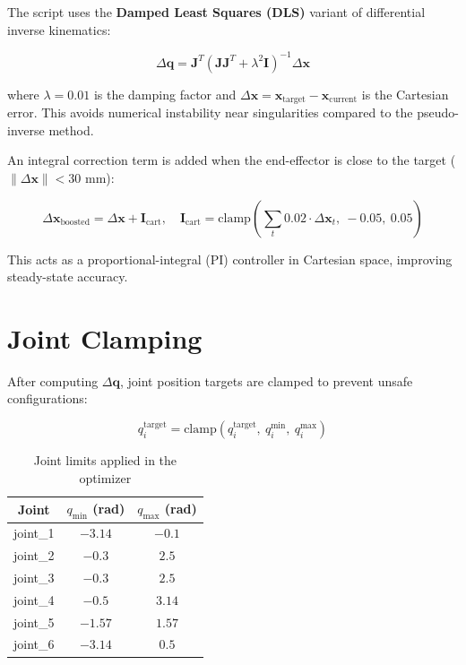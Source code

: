 \documentclass[a4paper,11pt]{article}
\begin{document}
The script uses the \textbf{Damped Least Squares (DLS)} variant of differential inverse kinematics:

\begin{equation}
    \Delta\mathbf{q} = \mathbf{J}^T \left(\mathbf{J}\mathbf{J}^T + \lambda^2 \mathbf{I}\right)^{-1} \Delta\mathbf{x}
    \label{eq:dls}
\end{equation}

where $\lambda = 0.01$ is the damping factor and $\Delta\mathbf{x} = \mathbf{x}_{\text{target}} - \mathbf{x}_{\text{current}}$ is the Cartesian error. This avoids numerical instability near singularities compared to the pseudo-inverse method.

An integral correction term is added when the end-effector is close to the target ($\|\Delta\mathbf{x}\| < 30$ mm):

\begin{equation}
    \Delta\mathbf{x}_{\text{boosted}} = \Delta\mathbf{x} + \mathbf{I}_{\text{cart}}, \quad \mathbf{I}_{\text{cart}} = \text{clamp}\!\left(\sum_{t} 0.02 \cdot \Delta\mathbf{x}_t,\ -0.05,\ 0.05\right)
\end{equation}

This acts as a proportional-integral (PI) controller in Cartesian space, improving steady-state accuracy.

\section{Joint Clamping}

After computing $\Delta\mathbf{q}$, joint position targets are clamped to prevent unsafe configurations:

\begin{equation}
    q_i^{\text{target}} = \text{clamp}(q_i^{\text{target}},\ q_i^{\min},\ q_i^{\max})
\end{equation}

\begin{table}[h]
\centering
\caption{Joint limits applied in the optimizer}
\begin{tabular}{ccc}
\toprule
\textbf{Joint} & $q_{\min}$ (rad) & $q_{\max}$ (rad) \\
\midrule
joint\_1 & $-3.14$ & $-0.1$ \\
joint\_2 & $-0.3$  & $2.5$  \\
joint\_3 & $-0.3$  & $2.5$  \\
joint\_4 & $-0.5$  & $3.14$ \\
joint\_5 & $-1.57$ & $1.57$ \\
joint\_6 & $-3.14$ & $0.5$  \\
\bottomrule
\end{tabular}
\label{tab:joints}
\end{table}
\end{document}
